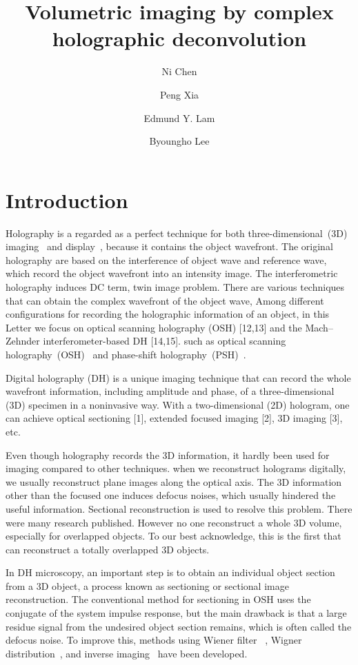 \documentclass[9pt,twocolumn,twoside]{osajnl}
\title{Volumetric imaging by complex holographic deconvolution}
\author[1]{Ni Chen}
\author[2]{Peng Xia}
\author[3]{Edmund Y. Lam}
\author[1,*]{Byoungho Lee}
\affil[1]{Department of Electrical and Computer Engineering,
Seoul National University, Seoul 08826, Korea}
\affil[2]{xxxxxxxxxxxxxxxxxxxxxxxxxxxx, Japan}
\affil[3]{Department of Electrical and Electronic Engineering, The University of Hong Kong, Pokfulam, Hong Kong}
\affil[*]{Corresponding author: byoungho@snu.ac.kr}
\begin{document}
\maketitle

\section{Introduction}\label{sec_intro}
Holography is a regarded as a perfect technique for both three-dimensional~(3D) imaging~\cite{Chen2018Sensors} and display~\cite{Hong2011AO}, because it contains the object wavefront.
The original holography are based on the interference of object wave and reference wave, which record the object wavefront into an intensity image. The interferometric holography induces DC term, twin image problem.
There are various techniques that can obtain the complex wavefront of the object wave, Among different configurations for recording the holographic information of an object, in this Letter we focus
on optical scanning holography (OSH) [12,13] and the
Mach–Zehnder interferometer-based DH [14,15]. 
such as optical scanning holography~(OSH)~\cite{Poon2009JOSK} and phase-shift holography~(PSH)~\cite{Yamaguchi2008OaPN}.

Digital holography (DH) is a unique imaging technique that
can record the whole wavefront information, including amplitude and phase, of a three-dimensional (3D) specimen in a
noninvasive way. With a two-dimensional (2D) hologram,
one can achieve optical sectioning [1], extended focused imaging [2], 3D imaging [3], etc.

Even though holography records the 3D information, it hardly been used for imaging compared to other techniques. 
when we reconstruct holograms digitally, we usually reconstruct plane images along the optical axis. The 3D information other than the focused one induces defocus noises, which usually hindered the useful information. Sectional reconstruction is used to resolve this problem. 
There were many research published. However no one reconstruct a whole 3D volume, especially for overlapped objects. 
To our best acknowledge, this is the first that can reconstruct a totally overlapped 3D objects.

In DH microscopy, an important step is to obtain an individual object section from a 3D object, a process known as sectioning or sectional image reconstruction. The conventional method for sectioning in OSH uses the conjugate of the system impulse response, but the main drawback is that a large residue signal from the undesired object section remains, which is often called the defocus noise. To improve this, methods using Wiener filter ~\cite{Kim2006AO}, Wigner distribution~\cite{Kim2008AO}, and inverse imaging~\cite{Lam2009AO,Zhang2010JOSA} have been developed.
\end{document}
